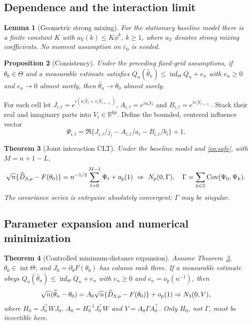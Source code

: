 \documentclass[11pt,a4paper]{article}
\newtheorem{theorem}{Theorem}[section]
\newtheorem{lemma}[theorem]{Lemma}
\newtheorem{proposition}[theorem]{Proposition}
\theoremstyle{remark}\newtheorem{remark}[theorem]{Remark}
\newcommand{\R}{\mathbb R}\newcommand{\norm}[1]{\left\lVert#1\right\rVert}
\DeclareMathOperator{\Cov}{Cov}\DeclareMathOperator{\Var}{Var}
\begin{document}
\subsection{Dependence and the interaction limit}
\begin{lemma}[Geometric strong mixing]\label{lem:mix}
For the stationary baseline model there is a finite constant $K$ with
$a_Y(k)\le K\phi^k$, $k\ge1$, where $a_Y$ denotes strong mixing coefficients. No moment assumption on $\varepsilon_0$ is needed.
\end{lemma}


\begin{proposition}[Consistency]\label{prop:cons}
Under the preceding fixed-grid assumptions, if $\theta_0\in\Theta$ and a measurable estimate satisfies
$Q_n(\widehat\theta_n)\le\inf_\Theta Q_n+e_n$ with $e_n\ge0$ and $e_n\to0$ almost surely, then $\widehat\theta_n\to\theta_0$ almost surely.
\end{proposition}


For each cell let $J_{i,t}=e^{i(u_iY_t+v_iY_{t+\ell_i})}$,
$A_{i,t}=e^{iu_iY_t}$ and $B_{i,t}=e^{iv_iY_{t+\ell_i}}$. Stack their real and imaginary parts into $V_t\in\R^{6p}$. Define the bounded, centered influence vector
\begin{equation}\label{eq:psi}
\Psi_{i,t}=\Re\{J_{i,t}/j_i-A_{i,t}/a_i-B_{i,t}/b_i\}+1.
\end{equation}

\begin{theorem}[Joint interaction CLT]\label{thm:clt}
Under the baseline model and \eqref{eq:safe}, with $M=n+1-L$,
\begin{equation}\label{eq:clt}
\sqrt n\{\hD_{S,\rho}-F(\theta_0)\}
=n^{-1/2}\sum_{t=0}^{M-1}\Psi_t+o_p(1)
\ \Rightarrow\ N_p(0,\Gamma),\quad
\Gamma=\sum_{k\in\mathbb Z}\Cov(\Psi_0,\Psi_k).
\end{equation}
The covariance series is entrywise absolutely convergent; $\Gamma$ may be singular.
\end{theorem}


\subsection{Parameter expansion and numerical minimization}
\begin{theorem}[Controlled minimum-distance expansion]\label{thm:md}
Assume Theorem~\ref{thm:clt}, $\theta_0\in\operatorname{int}\Theta$, and $J_0=\partial_\theta F(\theta_0)$ has column rank three. If a measurable estimate obeys
$Q_n(\widehat\theta_n)\le\inf_\Theta Q_n+e_n$ with $e_n\ge0$ and $e_n=o_p(n^{-1})$, then
\begin{equation}\label{eq:md}
\sqrt n(\widehat\theta_n-\theta_0)
=A_0\sqrt n\{\widehat D_{S,\rho}-F(\theta_0)\}+o_p(1)
\Rightarrow N_3(0,V),
\end{equation}
where $H_0=J_0^\top WJ_0$, $A_0=H_0^{-1}J_0^\top W$ and $V=A_0\Gamma A_0^\top$. Only $H_0$, not $\Gamma$, must be invertible here.
\end{theorem}
\end{document}
